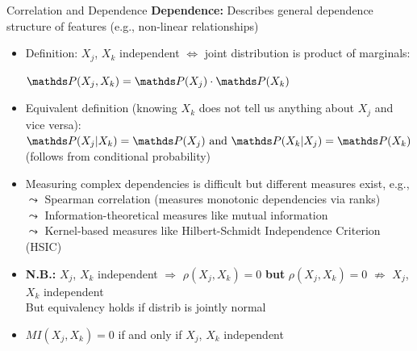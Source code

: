 \documentclass[11pt,compress,t,notes=noshow, aspectratio=169, xcolor=table]{beamer}
\begin{document}
\begin{frame}{Correlation and Dependence}
\textbf{Dependence:} Describes general dependence structure of features (e.g., non-linear relationships)

\begin{itemize}[<+->]
\item Definition: $X_j$, $X_k$ independent $\Leftrightarrow$ joint distribution is product of marginals:\\ \vspace{5pt}
\centerline{$\P(X_j, X_k) = \P(X_j) \cdot \P(X_k)$}
\vspace{5pt}
\item Equivalent definition (knowing $X_k$ does not tell us anything about $X_j$ and vice versa): \\
\vspace{5pt}
\phantom{AAA} $\P(X_j|X_k) = \P(X_j) \text{ and } \P(X_k|X_j) = \P(X_k)$ \hfill (follows from conditional probability) \phantom{AAA}
\vspace{5pt}
\item Measuring complex dependencies is difficult but different measures exist, e.g., \\
$\leadsto$ Spearman correlation (measures monotonic dependencies via ranks) \\
$\leadsto$ Information-theoretical measures like mutual information \\
$\leadsto$ Kernel-based measures like Hilbert-Schmidt Independence Criterion (HSIC)
\item \textbf{N.B.:} $X_j$, $X_k$ independent $\Rightarrow$ $\rho(X_j, X_k) = 0$ \textbf{but} $\rho(X_j, X_k) = 0$ $\nRightarrow$ $X_j$, $X_k$  independent \\
But equivalency holds if distrib is jointly normal
\item  $MI(X_j, X_k) = 0$ if and only if $X_j$, $X_k$ independent
\end{itemize}
\end{frame}
\end{document}
